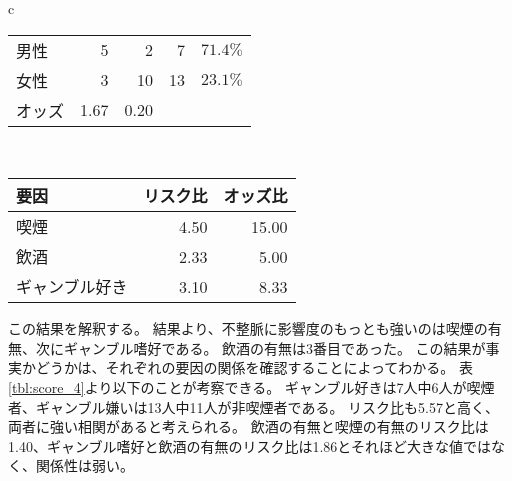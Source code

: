 \documentclass{ltjsarticle}
\begin{document}
\begin{table}[b]
\begin{tabular}{c}
\begin{minipage}{0.4\hsize}
\begin{tabular}{l|r|r|r|r}
                男性 & 5 & 2 & 7 & $71.4\%$ \\
                女性 & 3 & 10 & 13 & $23.1\%$ \\ \hline 
                オッズ & 1.67 & 0.20 & \multicolumn{2}{|l}{} \\ \hline
            \end{tabular}
        \end{minipage} \\
        \begin{minipage}{0.4\hsize}
            \centering
            \begin{tabular}{l|r|r} \hline 
                要因& \multicolumn{1}{|l|}{リスク比} & \multicolumn{1}{l}{オッズ比} \\\hline \hline
                喫煙& 4.50 & 15.00  \\
                飲酒& 2.33 & 5.00 \\
                ギャンブル好き& 3.10 & 8.33 \\ \hline 
            \end{tabular}
        \end{minipage}
    \end{tabular}
\end{table}
この結果を解釈する。
結果より、不整脈に影響度のもっとも強いのは喫煙の有無、次にギャンブル嗜好である。
飲酒の有無は3番目であった。
この結果が事実かどうかは、それぞれの要因の関係を確認することによってわかる。
表\ref{tbl:score_4}より以下のことが考察できる。
ギャンブル好きは7人中6人が喫煙者、ギャンブル嫌いは13人中11人が非喫煙者である。
リスク比も5.57と高く、両者に強い相関があると考えられる。
飲酒の有無と喫煙の有無のリスク比は1.40、ギャンブル嗜好と飲酒の有無のリスク比は1.86とそれほど大きな値ではなく、関係性は弱い。
\end{document}
